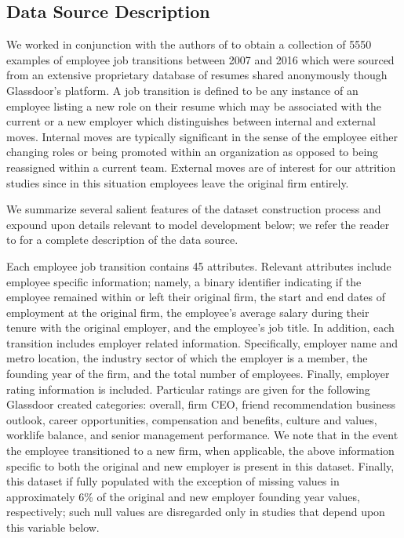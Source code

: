 \documentclass[10pt]{article}
\begin{document}
\subsection{Data Source Description}\label{datdes}

We worked in conjunction with the authors of \cite{Smart2016} to obtain 
a collection of 5550 examples of employee job transitions between 
2007 and 2016 which were sourced from an extensive proprietary database of 
resumes shared anonymously though Glassdoor's platform.  A job transition 
is defined to be any instance of an employee listing a new role on their 
resume which may be associated with the current or a new employer
which distinguishes between internal and external moves.  Internal moves are typically 
significant in the sense of the employee either changing roles or 
being promoted within an organization as opposed to being reassigned 
within a current team. External moves are of interest for our 
attrition studies since in this situation employees leave the original 
firm entirely.

We summarize several salient features of the dataset construction process 
and expound upon details relevant to model development below; we refer the
reader to \cite{Smart2016} for a complete description of the data source. 

Each employee job transition contains 45 attributes.  Relevant attributes 
include employee specific information; namely, a binary identifier 
indicating if the employee remained within or left their original firm,
the start and end dates of employment at the original firm, the 
employee's average salary during their tenure with the original employer, 
and the employee's job title. 
In addition, each transition includes employer related information. 
Specifically, employer name and metro location, the industry sector of which the employer 
is a member, the founding year of the firm, and the total number of employees. 
Finally, employer rating information is included.  Particular ratings are 
given for the following Glassdoor created categories: overall, firm CEO, friend recommendation 
business outlook, career opportunities, compensation and benefits, culture and values, 
worklife balance, and senior management performance. 
We note that in the event the employee transitioned to a new firm, when applicable,
the above information specific to both the original and new employer is present in this dataset. 
Finally, this dataset if fully populated with the exception of missing values in 
approximately 6\% of the original and new employer founding year values, respectively;
such null values are disregarded 
only in studies that depend upon this variable below.
\end{document}
